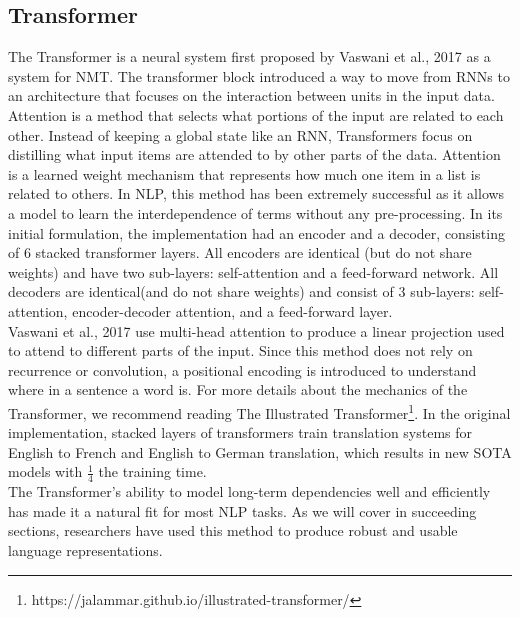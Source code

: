\subsection{Transformer}
\label{chap:prior:sec:arch:transformer}
The Transformer is a neural system first proposed by Vaswani et al., 2017  \cite{Vaswani2017AttentionIA} as a system for NMT. The transformer block introduced a way to move from RNNs to an architecture that focuses on the interaction between units in the input data. Attention is a method that selects what portions of the input are related to each other. Instead of keeping a global state like an RNN, Transformers focus on distilling what input items are attended to by other parts of the data. Attention is a learned weight mechanism that represents how much one item in a list is related to others. In NLP, this method has been extremely successful as it allows a model to learn the interdependence of terms without any pre-processing. In its initial formulation, the implementation had an encoder and a decoder, consisting of 6 stacked transformer layers. All encoders are identical (but do not share weights) and have two sub-layers: self-attention and a feed-forward network. All decoders are identical(and do not share weights) and consist of 3 sub-layers: self-attention, encoder-decoder attention, and a feed-forward layer. \\ 
Vaswani et al., 2017 use multi-head attention to produce a linear projection used to attend to different parts of the input. Since this method does not rely on recurrence or convolution, a positional encoding is introduced to understand where in a sentence a word is. For more details about the mechanics of the Transformer, we recommend reading The Illustrated Transformer\footnote{https://jalammar.github.io/illustrated-transformer/}. In the original implementation,  stacked layers of transformers train translation systems for English to French and English to German translation, which results in new SOTA models with $\frac{1}{4}$ the training time. \\
The Transformer's ability to model long-term dependencies well and efficiently has made it a natural fit for most NLP tasks. As we will cover in succeeding sections, researchers have used this method to produce robust and usable language representations.